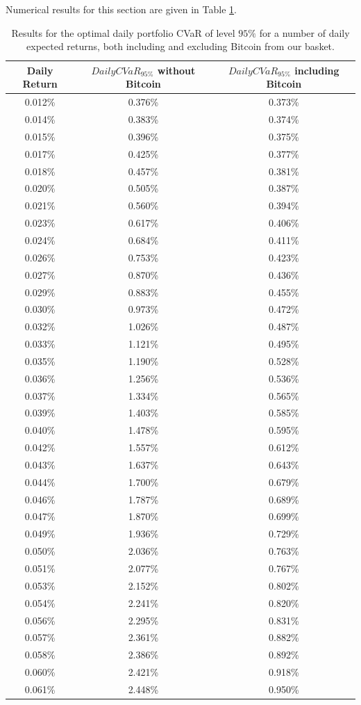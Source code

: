 Numerical results for this section are given in Table \ref{tab:return_cvar}.

\begin{table}
	\centering
	\caption[CVaR efficient frontier on returns]{Results for the optimal daily portfolio CVaR of level $95\%$ for a number of daily expected returns, both including and excluding Bitcoin from our basket.}
	\label{tab:return_cvar}
\begin{tabular}{ccc}
	
	Daily Return & $DailyCVaR_{95\%}$ without Bitcoin & $DailyCVaR_{95\%}$ including Bitcoin \\
	\midrule
	0.012\% & 0.376\% & 0.373\% \\
	0.014\% & 0.383\% & 0.374\% \\
	0.015\% & 0.396\% & 0.375\% \\
	0.017\% & 0.425\% & 0.377\% \\
	0.018\% & 0.457\% & 0.381\% \\
	0.020\% & 0.505\% & 0.387\% \\
	0.021\% & 0.560\% & 0.394\% \\
	0.023\% & 0.617\% & 0.406\% \\
	0.024\% & 0.684\% & 0.411\% \\
	0.026\% & 0.753\% & 0.423\% \\
	0.027\% & 0.870\% & 0.436\% \\
	0.029\% & 0.883\% & 0.455\% \\
	0.030\% & 0.973\% & 0.472\% \\
	0.032\% & 1.026\% & 0.487\% \\
	0.033\% & 1.121\% & 0.495\% \\
	0.035\% & 1.190\% & 0.528\% \\
	0.036\% & 1.256\% & 0.536\% \\
	0.037\% & 1.334\% & 0.565\% \\
	0.039\% & 1.403\% & 0.585\% \\
	0.040\% & 1.478\% & 0.595\% \\
	0.042\% & 1.557\% & 0.612\% \\
	0.043\% & 1.637\% & 0.643\% \\
	0.044\% & 1.700\% & 0.679\% \\
	0.046\% & 1.787\% & 0.689\% \\
	0.047\% & 1.870\% & 0.699\% \\
	0.049\% & 1.936\% & 0.729\% \\
	0.050\% & 2.036\% & 0.763\% \\
	0.051\% & 2.077\% & 0.767\% \\
	0.053\% & 2.152\% & 0.802\% \\
	0.054\% & 2.241\% & 0.820\% \\
	0.056\% & 2.295\% & 0.831\% \\
	0.057\% & 2.361\% & 0.882\% \\
	0.058\% & 2.386\% & 0.892\% \\
	0.060\% & 2.421\% & 0.918\% \\
	0.061\% & 2.448\% & 0.950\% \\
	\midrule
\end{tabular}

\end{table}

